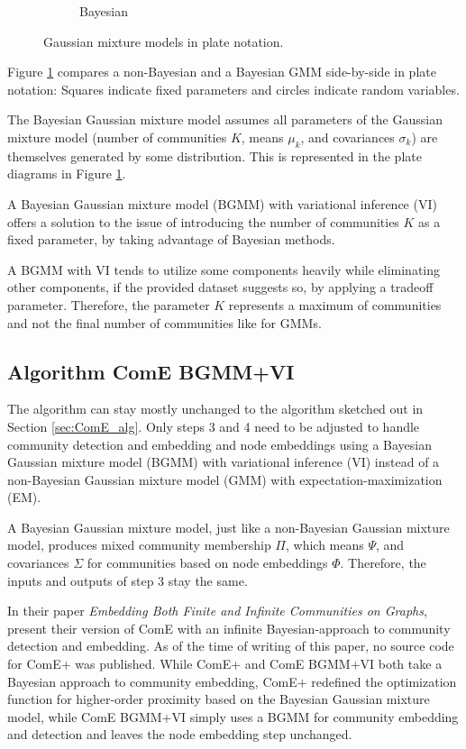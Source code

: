 \documentclass[conference]{IEEEtran}
\begin{document}
\begin{figure}[H]
\begin{subfigure}[b]{.5\linewidth}
        \caption{Bayesian}
    \end{subfigure}%
    \caption{Gaussian mixture models in plate notation\protect\footnotemark.}
    \label{fig:GMM_vs_BGMM_plates}
\end{figure}

Figure \ref{fig:GMM_vs_BGMM_plates} compares a non-Bayesian and a Bayesian GMM side-by-side in plate notation: Squares indicate fixed parameters and circles indicate random variables.

The Bayesian Gaussian mixture model assumes all parameters of the Gaussian mixture model (number of communities $K$, means $\mu_k$, and covariances $\sigma_k$) are themselves generated by some distribution. This is represented in the plate diagrams in Figure \ref{fig:GMM_vs_BGMM_plates}.

A Bayesian Gaussian mixture model (BGMM) with variational inference (VI) offers a solution to the issue of introducing the number of communities $K$ as a fixed parameter, by taking advantage of Bayesian methods.

A BGMM with VI tends to utilize some components heavily while eliminating other components, if the provided dataset suggests so, by applying a tradeoff parameter. Therefore, the parameter $K$ represents a maximum of communities and not the final number of communities like for GMMs.

\subsection{Algorithm ComE BGMM+VI}
\label{sec:ComE_BGMM_alg}

The algorithm can stay mostly unchanged to the algorithm sketched out in Section \ref{sec:ComE_alg}. Only steps 3 and 4 need to be adjusted to handle community detection and embedding and node embeddings using a Bayesian Gaussian mixture model (BGMM) with variational inference (VI) instead of a non-Bayesian Gaussian mixture model (GMM) with expectation-maximization (EM).

A Bayesian Gaussian mixture model, just like a non-Bayesian Gaussian mixture model, produces mixed community membership $\Pi$, which means $\Psi$, and covariances $\Sigma$ for communities based on node embeddings $\Phi$. Therefore, the inputs and outputs of step 3 stay the same.

In their \citeyear{ComE+} paper \textit{Embedding Both Finite and Infinite Communities on Graphs}, \citeauthor{ComE+} present their version of ComE with an infinite Bayesian-approach to community detection and embedding. As of the time of writing of this paper, no source code for ComE+ was published. While ComE+ and ComE BGMM+VI both take a Bayesian approach to community embedding, ComE+ redefined the optimization function for higher-order proximity based on the Bayesian Gaussian mixture model, while ComE BGMM+VI simply uses a BGMM for community embedding and detection and leaves the node embedding step unchanged.
\end{document}
